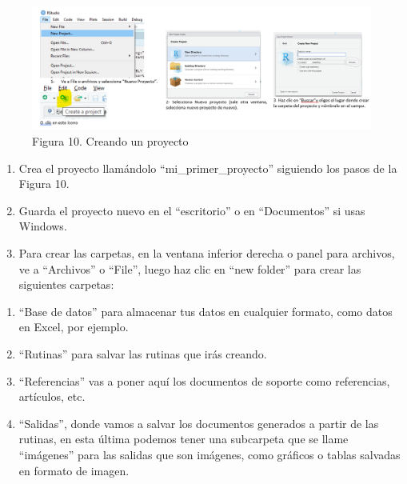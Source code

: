 \documentclass[
  letterpaper,
  DIV=11,
  numbers=noendperiod]{scrreprt}
\begin{document}
\begin{figure}[H]

{\centering \includegraphics[width=6.18in,height=\textheight,keepaspectratio]{imagenes/01proyectonuevo.png}

}

\caption{Figura 10. Creando un proyecto}

\end{figure}%

\begin{enumerate}
\def\labelenumi{\arabic{enumi}.}
\item
  Crea el proyecto llamándolo ``mi\_primer\_proyecto'' siguiendo los
  pasos de la Figura 10.
\item
  Guarda el proyecto nuevo en el ``escritorio'' o en ``Documentos'' si
  usas Windows.
\item
  Para crear las carpetas, en la ventana inferior derecha o panel para
  archivos, ve a ``Archivos'' o ``File'', luego haz clic en ``new
  folder'' para crear las siguientes carpetas:
\end{enumerate}

\begin{enumerate}
\def\labelenumi{\alph{enumi}.}
\item
  ``Base de datos'' para almacenar tus datos en cualquier formato, como
  datos en Excel, por ejemplo.
\item
  ``Rutinas'' para salvar las rutinas que irás creando.
\item
  ``Referencias'' vas a poner aquí los documentos de soporte como
  referencias, artículos, etc.
\item
  ``Salidas'', donde vamos a salvar los documentos generados a partir de
  las rutinas, en esta última podemos tener una subcarpeta que se llame
  ``imágenes'' para las salidas que son imágenes, como gráficos o tablas
  salvadas en formato de imagen.
\end{enumerate}
\end{document}
